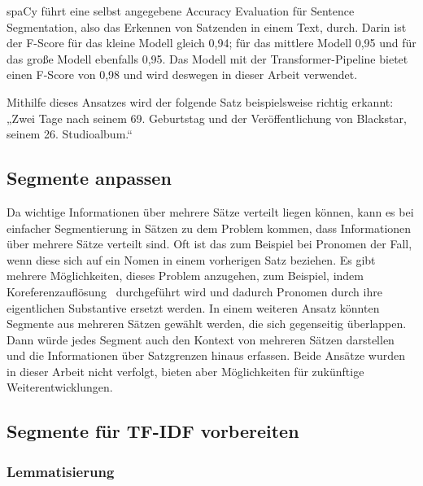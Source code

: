 spaCy führt eine selbst angegebene Accuracy Evaluation für Sentence Segmentation, also das Erkennen von Satzenden in einem Text, durch.
Darin ist der F-Score für das kleine Modell gleich 0,94; für das mittlere Modell 0,95 und für das große Modell ebenfalls 0,95.
Das Modell mit der Transformer-Pipeline bietet einen F-Score von 0,98 und wird deswegen in dieser Arbeit verwendet.~\cite{spacy2024}

Mithilfe dieses Ansatzes wird der folgende Satz beispielsweise richtig erkannt:
„Zwei Tage nach seinem 69. Geburtstag und der Veröffentlichung von Blackstar, seinem 26. Studioalbum.“


\subsection{Segmente anpassen}

Da wichtige Informationen über mehrere Sätze verteilt liegen können, kann es bei einfacher Segmentierung in Sätzen zu dem Problem kommen, dass Informationen über mehrere Sätze verteilt sind.
Oft ist das zum Beispiel bei Pronomen der Fall, wenn diese sich auf ein Nomen in einem vorherigen Satz beziehen.
Es gibt mehrere Möglichkeiten, dieses Problem anzugehen, zum Beispiel, indem Koreferenzauflösung~\cite{lee2017} durchgeführt wird und dadurch Pronomen durch ihre eigentlichen Substantive ersetzt werden.
In einem weiteren Ansatz könnten Segmente aus mehreren Sätzen gewählt werden, die sich gegenseitig überlappen.
Dann würde jedes Segment auch den Kontext von mehreren Sätzen darstellen und die Informationen über Satzgrenzen hinaus erfassen.
Beide Ansätze wurden in dieser Arbeit nicht verfolgt, bieten aber Möglichkeiten für zukünftige Weiterentwicklungen.

\subsection{Segmente für TF-IDF vorbereiten}

\subsubsection{Lemmatisierung}


